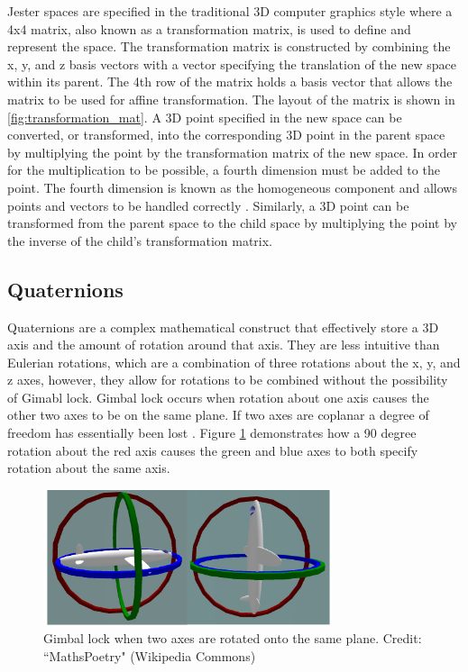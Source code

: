 Jester spaces are specified in the traditional 3D computer graphics style where a 4x4 matrix, also known as a transformation matrix, is used to define and represent the space. The transformation matrix is constructed by combining the x, y, and z basis vectors with a vector specifying the translation of the new space within its parent. The 4th row of the matrix holds a basis vector that allows the matrix to be used for affine transformation. The layout of the matrix is shown in \ref{fig:transformation_mat}. A 3D point specified in the new space can be converted, or transformed, into the corresponding 3D point in the parent space by multiplying the point by the transformation matrix of the new space. In order for the multiplication to be possible, a fourth dimension must be added to the point. The fourth dimension is known as the homogeneous component and allows points and vectors to be handled correctly \cite{roberts1963machine}. Similarly, a 3D point can be transformed from the parent space to the child space by multiplying the point by the inverse of the child's transformation matrix.

\subsection{Quaternions}

Quaternions are a complex mathematical construct that effectively store a 3D axis and the amount of rotation around that axis. They are less intuitive than Eulerian rotations, which are a combination of three rotations about the x, y, and z axes, however, they allow for rotations to be combined without the possibility of Gimabl lock. Gimbal lock occurs when rotation about one axis causes the other two axes to be on the same plane. If two axes are coplanar a degree of freedom has essentially been lost \cite{gortler2012foundations}. Figure \ref{fig:gimbal_lock} demonstrates how a 90 degree rotation about the red axis causes the green and blue axes to both specify rotation about the same axis.

\begin{figure}[h]
\centering
\includegraphics[width=0.75\textwidth]{figures/gimbals}
\caption{Gimbal lock when two axes are rotated onto the same plane. Credit: ``MathsPoetry" (Wikipedia Commons)}
\label{fig:gimbal_lock}
\end{figure}

